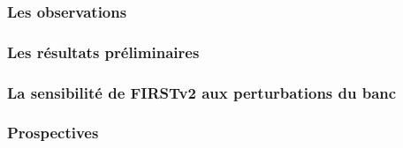 \subsubsection{Les observations}

\subsubsection{Les résultats préliminaires}

\subsubsection{La sensibilité de FIRSTv2 aux perturbations du banc}

\subsubsection{Prospectives}

